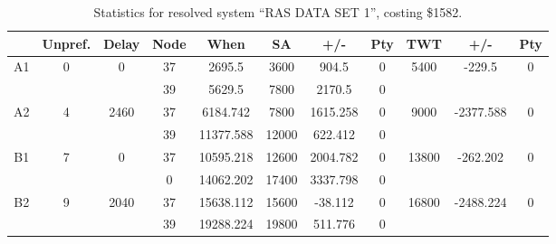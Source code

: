 \begin{sidewaystable}
\footnotesize
\caption{Statistics for resolved system ``RAS DATA SET 1'', costing \$1582.}
\centering
\begin{tabular}{c||c|c||c|c|c|c|c||c|c|c}
  \hline \hline
  &
  Unpref. & 
  Delay &
  Node &
  When &
  SA &
  +/- &
  Pty &
  TWT &
  +/- &
  Pty \\
      \hline
      \multirow{2}{*}{A1} &
      \multirow{2}{*}{0} &
      \multirow{2}{*}{0} &
      37 &
      2695.5 &
      3600 &
        904.5 &
        0 &
      \multirow{2}{*}{5400} &
        \multirow{2}{*}{-229.5} &
        \multirow{2}{*}{0}
      \\
      \cline{4-8}
       &
       &
       &
      39 &
      5629.5 &
      7800 &
        2170.5 &
        0 &
      
         &
        
      \\
      \hline
      \multirow{2}{*}{A2} &
      \multirow{2}{*}{4} &
      \multirow{2}{*}{2460} &
      37 &
      6184.742 &
      7800 &
        1615.258 &
        0 &
      \multirow{2}{*}{9000} &
        \multirow{2}{*}{-2377.588} &
        \multirow{2}{*}{0}
      \\
      \cline{4-8}
       &
       &
       &
      39 &
      11377.588 &
      12000 &
        622.412 &
        0 &
      
         &
        
      \\
      \hline
      \multirow{2}{*}{B1} &
      \multirow{2}{*}{7} &
      \multirow{2}{*}{0} &
      37 &
      10595.218 &
      12600 &
        2004.782 &
        0 &
      \multirow{2}{*}{13800} &
        \multirow{2}{*}{-262.202} &
        \multirow{2}{*}{0}
      \\
      \cline{4-8}
       &
       &
       &
      0 &
      14062.202 &
      17400 &
        3337.798 &
        0 &
      
         &
        
      \\
      \hline
      \multirow{2}{*}{B2} &
      \multirow{2}{*}{9} &
      \multirow{2}{*}{2040} &
      37 &
      15638.112 &
      15600 &
        -38.112 &
        0 &
      \multirow{2}{*}{16800} &
        \multirow{2}{*}{-2488.224} &
        \multirow{2}{*}{0}
      \\
      \cline{4-8}
       &
       &
       &
      39 &
      19288.224 &
      19800 &
        511.776 &
        0 &
      

\end{tabular}
\end{sidewaystable}
